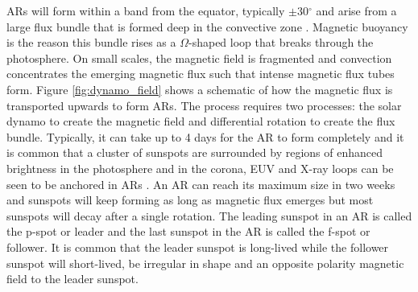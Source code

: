 	ARs will form within a band from the equator, typically $\pm$30$^\circ$ and arise from a large flux bundle that is formed deep in the convective zone \citep{SAO,1974MNRAS.169...35M,2014SoPh..289.3351T}.
	Magnetic buoyancy is the reason this bundle rises as a $\Omega$-shaped loop that breaks through the photosphere.
	On small scales, the magnetic field is fragmented and convection concentrates the emerging magnetic flux such that intense magnetic flux tubes form.
	Figure \ref{fig:dynamo_field} shows a schematic of how the magnetic flux is transported upwards to form ARs.
	The process requires two processes: the solar dynamo to create the magnetic field and differential rotation to create the flux bundle.
	Typically, it can take up to 4 days for the AR to form completely and it is common that a cluster of sunspots are surrounded by regions of enhanced brightness in the photosphere and in the corona, EUV and X-ray loops can be seen to be anchored in ARs \citep{2014masu.book.....P}.
	An AR can reach its maximum size in two weeks and sunspots will keep forming as long as magnetic flux emerges but most sunspots will decay after a single rotation.
	The leading sunspot in an AR is called the p-spot or leader and the last sunspot in the AR is called the f-spot or follower.
	It is common that the leader sunspot is long-lived while the follower sunspot will short-lived, be irregular in shape and an opposite polarity magnetic field to the leader sunspot.
	
